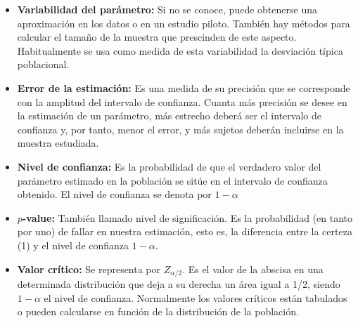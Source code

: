 \documentclass[a4paper]{report} %
\begin{document}
\begin{itemize}
    \begin{itemize}
        \item \textbf{\textit{Puntual:}} cuando buscamos un valor concreto. Un estimador de un par\'ametro poblacional es una funci\'on de los datos muestrales. En pocas palabras, es una f\'ormula que depende de los valores obtenidos de una muestra, para realizar estimaciones. Lo que se pretende obtener es el valor exacto de un par\'ametro.
    \item \textbf{\textit{Intervalo de confianza:}} cuando determinamos un intervalo, dentro del cual se supone que va a estar el valor del par\'ametro que se busca con una cierta probabilidad. El intervalo de confianza est\'a determinado por dos valores dentro de los cuales afirmamos que est\'a el verdadero par\'ametro con cierta probabilidad. Son unos l\'imites o margen de variabilidad que damos al valor estimado, para poder afirmar, bajo un criterio de probabilidad, que el verdadero valor no los rebasar\'a.

Este intervalo contiene al par\'ametro estimado con una determinada certeza o nivel de confianza. 
\end{itemize}

En la estimaci\'on por intervalos se usan los siguientes conceptos:

\item \textbf{Variabilidad del par\'ametro:} Si no se conoce, puede obtenerse una aproximaci\'on en los datos o en un estudio piloto. Tambi\'en hay m\'etodos para calcular el tama\~no de la muestra que prescinden de este aspecto. Habitualmente se usa como medida de esta variabilidad la desviaci\'on t\'ipica poblacional.
\item \textbf{Error de la estimaci\'on:} Es una medida de su precisi\'on que se corresponde con la amplitud del intervalo de confianza. Cuanta m\'as precisi\'on se desee en la estimaci\'on de un par\'ametro, m\'as estrecho deber\'a ser el intervalo de confianza y, por tanto, menor el error, y m\'as sujetos deber\'an incluirse en la muestra estudiada. 
\item \textbf{Nivel de confianza:} Es la probabilidad de que el verdadero valor del par\'ametro estimado en la poblaci\'on se sit\'ue en el intervalo de confianza obtenido. El nivel de confianza se denota por $1-\alpha$
\item \textbf{$p$-value:} Tambi\'en llamado nivel de significaci\'on. Es la probabilidad (en tanto por uno) de fallar en nuestra estimaci\'on, esto es, la diferencia entre la certeza (1) y el nivel de confianza $1-\alpha$. 
\item \textbf{Valor cr\'itico:} Se representa por $Z_{\alpha/2}$. Es el valor de la abscisa en una determinada distribuci\'on que deja a su derecha un \'area igual a 1/2, siendo $1-\alpha$ el nivel de confianza. Normalmente los valores cr\'iticos est\'an tabulados o pueden calcularse en funci\'on de la distribuci\'on de la poblaci\'on.

\end{itemize}
\end{document}
